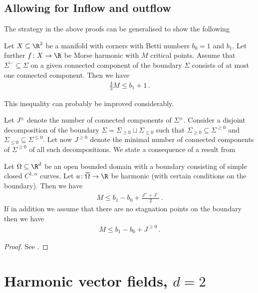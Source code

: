 \section{Allowing for Inflow and outflow}

The strategy in the above proofs can be generalised to show the following
\begin{conjecture}
  Let $X\subseteq\R^2$ be a manifold with corners with Betti numbers $b_0=1$ and $b_1$.
  Let further $f\colon X\to\R$ be Morse harmonic with $M$ critical points.
  Assume that 
  $\overline{\Sigma^-}\subseteq\Sigma$ on a given connected component 
  of the boundary $\Sigma$
  consists of at most one connected component. Then we have
  \begin{align*}
    \frac{4}{3}M\leq b_1+1\,.
  \end{align*}
\end{conjecture}
This inequality can probably be improved considerably.

Let $J^\pm$ denote the number of connected components of $\Sigma^\pm$.
Consider a disjoint decomposition of the boundary $\Sigma=\Sigma_{\geq0}\sqcup\Sigma_{\leq0}$ such
that $\Sigma_{\geq0}\subseteq\Sigma^{\geq0}$ and $\Sigma_{\leq0}\subseteq\Sigma^{\leq0}$.
Let now $J^{\geq0}$ denote the minimal number of connected components of $\Sigma^{\geq0}$ of all such
decompositions.
We state a consequence of a result from \cite[Theorem 2.1]{Alessandrini1992}
\begin{proposition} 
  Let $\Omega\subseteq\R^d$ be an open bounded domain with a boundary consisting of simple closed $C^{1,\alpha}$ curves.
  Let $u\colon \overline{\Omega}\to \R$ be harmonic (with certain conditions on the boundary).
  Then we have
  \begin{align*}
    M\leq b_1-b_0+\frac{J^++J^-}{2}\,.
  \end{align*}
  If in addition we assume that there are no stagnation points on the boundary then we have
  \begin{align*}
    M\leq b_1-b_0+J^{\geq0}\,.
  \end{align*}
\end{proposition}
\begin{proof}
  See \cite[Theorem 2.1]{Alessandrini1992}.
\end{proof}

\chapter{Harmonic vector fields, $d=2$}


